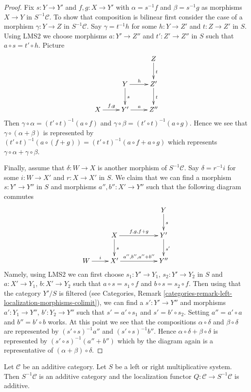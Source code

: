 \begin{proof}
\medskip\noindent
Fix $s : Y \to Y'$ and $f, g : X \to Y'$ with
$\alpha = s^{-1}f$ and $\beta = s^{-1}g$ as morphisms $X \to Y$
in $S^{-1}\mathcal{C}$.
To show that composition is bilinear first consider the case of a
morphism $\gamma : Y \to Z$ in $S^{-1}\mathcal{C}$. Say $\gamma = t^{-1}h$
for some $h : Y \to Z'$ and $t : Z \to Z'$ in $S$. Using LMS2 we
choose morphisms $a : Y' \to Z''$ and $t' : Z' \to Z''$ in $S$ such
that $a \circ s = t' \circ h$. Picture
$$
\xymatrix{
& & Z \ar[d]^t \\
& Y \ar[r]^h \ar[d]^s & Z' \ar[d]^t \\
X \ar[r]^{f, g} & Y' \ar[r]^a & Z''
}
$$
Then
$\gamma \circ \alpha = (t' \circ t)^{-1}(a \circ f)$ and
$\gamma \circ \beta = (t' \circ t)^{-1}(a \circ g)$.
Hence we see that $\gamma \circ (\alpha + \beta)$ is represented
by $(t' \circ t)^{-1}(a \circ (f + g)) =
(t' \circ t)^{-1}(a \circ f + a \circ g)$ which represents
$\gamma \circ \alpha + \gamma \circ \beta$.

\medskip\noindent
Finally, assume that $\delta : W \to X$ is another morphism of
$S^{-1}\mathcal{C}$. Say $\delta = r^{-1}i$ for some
$i : W \to X'$ and $r : X \to X'$ in $S$. We claim that we can find
a morphism $s : Y' \to Y''$ in $S$ and morphisms $a'', b'' : X' \to Y''$
such that the following diagram commutes
$$
\xymatrix{
& & & Y \ar[d]^s \\
& X \ar[rr]^{f, g, f + g} \ar[d]^s & & Y' \ar[d]^{s'} \\
W \ar[r]^i & X' \ar[rr]^{a'', b'', a'' + b''} & & Y''
}
$$
Namely, using LMS2 we can first choose
$s_1 : Y' \to Y_1$, $s_2 : Y' \to Y_2$ in $S$ and
$a : X' \to Y_1$, $b : X' \to Y_2$ such that
$a \circ s = s_1 \circ f$ and $b \circ s = s_2 \circ f$.
Then using that the category $Y'/S$ is filtered (see
Categories, Remark \ref{categories-remark-left-localization-morphisms-colimit}),
we can
find a $s' : Y' \to Y''$ and morphisms $a' : Y_1 \to Y''$, $b' : Y_2 \to Y''$
such that $s' = a' \circ s_1$ and $s' = b' \circ s_2$. Setting
$a'' = a' \circ a$ and $b'' = b' \circ b$ works.
At this point we see that the compositions
$\alpha \circ \delta$ and $\beta \circ \delta$ are represented by
$(s' \circ s)^{-1}a''$ and $(s' \circ s)^{-1}b''$.
Hence $\alpha \circ \delta + \beta \circ \delta$ is represented
by $(s' \circ s)^{-1}(a'' + b'')$ which by the diagram again
is a representative of $(\alpha + \beta) \circ \delta$.
\end{proof}

\begin{lemma}
\label{lemma-localization-additive}
Let $\mathcal{C}$ be an additive category.
Let $S$ be a left or right multiplicative system.
Then $S^{-1}\mathcal{C}$ is an additive category and the localization functor
$Q : \mathcal{C} \to S^{-1}\mathcal{C}$ is additive.
\end{lemma}


